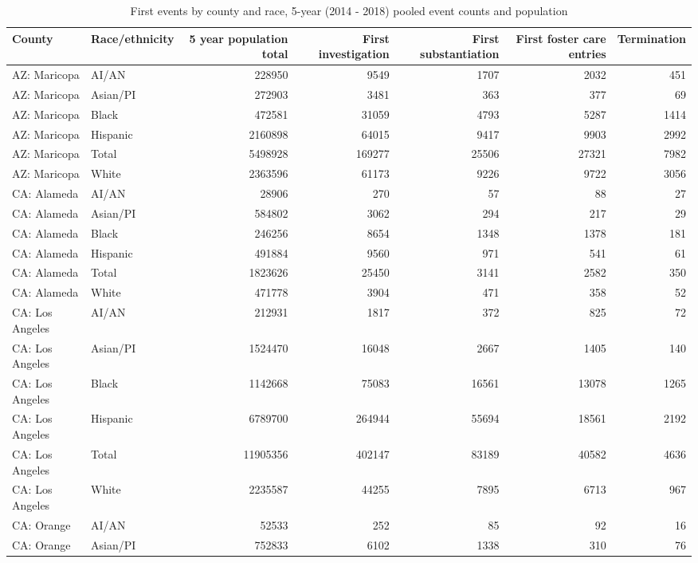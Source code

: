 \documentclass[9pt,twoside,lineno]{pnas-new}
\begin{document}
\begin{table}[ht]
\centering
\caption{First events by county and race, 5-year (2014 - 2018) pooled event counts and population} 

\begin{tabular}{llrrrrr}
  \hline
County & Race/ethnicity & 5 year population total & First investigation & First substantiation & First foster care entries & Termination \\ 
  \hline
AZ: Maricopa & AI/AN & 228950 & 9549 & 1707 & 2032 & 451 \\ 
  AZ: Maricopa & Asian/PI & 272903 & 3481 & 363 & 377 & 69 \\ 
  AZ: Maricopa & Black & 472581 & 31059 & 4793 & 5287 & 1414 \\ 
  AZ: Maricopa & Hispanic & 2160898 & 64015 & 9417 & 9903 & 2992 \\ 
  AZ: Maricopa & Total & 5498928 & 169277 & 25506 & 27321 & 7982 \\ 
  AZ: Maricopa & White & 2363596 & 61173 & 9226 & 9722 & 3056 \\ 
  CA: Alameda & AI/AN & 28906 & 270 & 57 & 88 & 27 \\ 
  CA: Alameda & Asian/PI & 584802 & 3062 & 294 & 217 & 29 \\ 
  CA: Alameda & Black & 246256 & 8654 & 1348 & 1378 & 181 \\ 
  CA: Alameda & Hispanic & 491884 & 9560 & 971 & 541 & 61 \\ 
  CA: Alameda & Total & 1823626 & 25450 & 3141 & 2582 & 350 \\ 
  CA: Alameda & White & 471778 & 3904 & 471 & 358 & 52 \\ 
  CA: Los Angeles & AI/AN & 212931 & 1817 & 372 & 825 & 72 \\ 
  CA: Los Angeles & Asian/PI & 1524470 & 16048 & 2667 & 1405 & 140 \\ 
  CA: Los Angeles & Black & 1142668 & 75083 & 16561 & 13078 & 1265 \\ 
  CA: Los Angeles & Hispanic & 6789700 & 264944 & 55694 & 18561 & 2192 \\ 
  CA: Los Angeles & Total & 11905356 & 402147 & 83189 & 40582 & 4636 \\ 
  CA: Los Angeles & White & 2235587 & 44255 & 7895 & 6713 & 967 \\ 
  CA: Orange & AI/AN & 52533 & 252 & 85 & 92 & 16 \\ 
  CA: Orange & Asian/PI & 752833 & 6102 & 1338 & 310 & 76 \\ 

\end{tabular}
\end{table}
\end{document}
